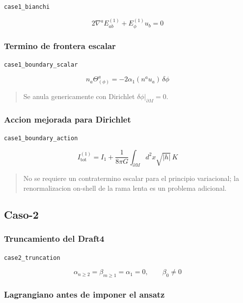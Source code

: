 \documentclass[11pt,a4paper]{article}
\begin{document}
\noindent\texttt{case1\_bianchi}\par\nopagebreak[4]

\[
2\nabla^aE^{(1)}_{ab}+E^{(1)}_\phi u_b = 0
\]

\subsubsection{Termino de frontera escalar}

\noindent\texttt{case1\_boundary\_scalar}\par\nopagebreak[4]

\[
n_a\Theta^a_{(\phi)} = -2\alpha_1(n^au_a)\,\delta\phi
\]

\begin{quote}\small Se anula genericamente con Dirichlet \(\delta\phi|_{\partial M}=0\).\end{quote}

\subsubsection{Accion mejorada para Dirichlet}

\noindent\texttt{case1\_boundary\_action}\par\nopagebreak[4]

\[
I^{(1)}_{\mathrm{tot}} = I_1+\frac{1}{8\pi G}\int_{\partial M}d^2x\sqrt{|h|}\,K
\]

\begin{quote}\small No se requiere un contratermino escalar para el principio variacional; la renormalizacion on-shell de la rama lenta es un problema adicional.\end{quote}

\subsection{Caso-2}

\subsubsection{Truncamiento del Draft4}

\noindent\texttt{case2\_truncation}\par\nopagebreak[4]

\[
\alpha_{n\ge2}=\beta_{m\ge1}=\alpha_1 = 0,\qquad \beta_0\ne0
\]

\subsubsection{Lagrangiano antes de imponer el ansatz}
\end{document}
